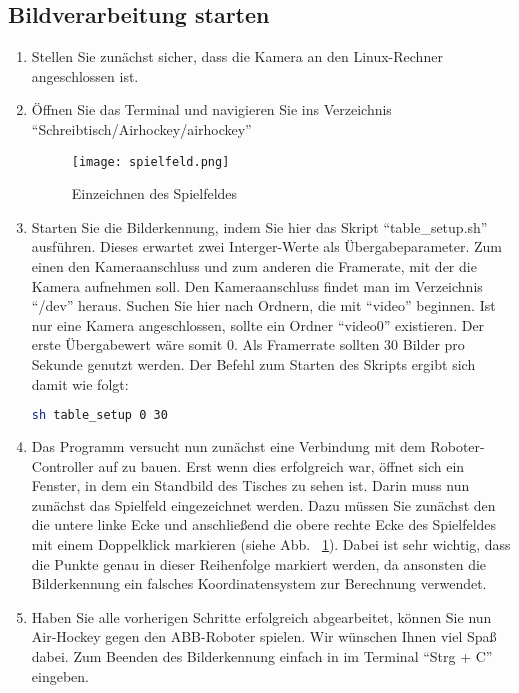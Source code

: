 \subsection{Bildverarbeitung starten}
\begin{enumerate}
\item Stellen Sie zunächst sicher, dass die Kamera an den Linux-Rechner angeschlossen ist.

\item Öffnen Sie das Terminal und navigieren Sie ins Verzeichnis \enquote{Schreibtisch/Airhockey/airhockey}


\begin{figure}[htbp]
\centering
\texttt{[image: spielfeld.png]}
\caption{Einzeichnen des Spielfeldes} 
\label{spielfeld}
\end{figure}

\item Starten Sie die Bilderkennung, indem Sie hier das Skript \enquote{table\_setup.sh} ausführen. Dieses erwartet zwei Interger-Werte als Übergabeparameter. Zum einen den Kameraanschluss und zum anderen die Framerate, mit der die Kamera aufnehmen soll. Den Kameraanschluss findet man im Verzeichnis \enquote{/dev} heraus. Suchen Sie hier nach Ordnern, die mit \enquote{video} beginnen. Ist nur eine Kamera angeschlossen, sollte ein Ordner \enquote{video0} existieren. Der erste Übergabewert wäre somit 0. Als Framerrate sollten 30 Bilder pro Sekunde genutzt werden. Der Befehl zum Starten des Skripts ergibt sich damit wie folgt:

\begin{lstlisting}[caption=Terminal-Befahl zum starten der Bilderkennung, label=start, language=bash]
sh table_setup 0 30
\end{lstlisting} 

\item Das Programm versucht nun zunächst eine Verbindung mit dem Roboter-Controller auf zu bauen. Erst wenn dies erfolgreich war, öffnet sich ein Fenster, in dem ein Standbild des Tisches zu sehen ist. Darin muss nun zunächst das Spielfeld eingezeichnet werden. Dazu müssen Sie zunächst den die untere linke Ecke und anschließend die obere rechte Ecke des Spielfeldes mit einem Doppelklick markieren (siehe Abb. ~\ref{spielfeld}). Dabei ist sehr wichtig, dass die Punkte genau in dieser Reihenfolge markiert werden, da ansonsten die Bilderkennung ein falsches Koordinatensystem zur Berechnung verwendet.   

\item Haben Sie alle vorherigen Schritte erfolgreich abgearbeitet, können Sie nun Air-Hockey gegen den ABB-Roboter spielen. Wir wünschen Ihnen viel Spaß dabei. Zum Beenden des Bilderkennung einfach in im Terminal \enquote{Strg + C} eingeben.   

\end{enumerate} 

